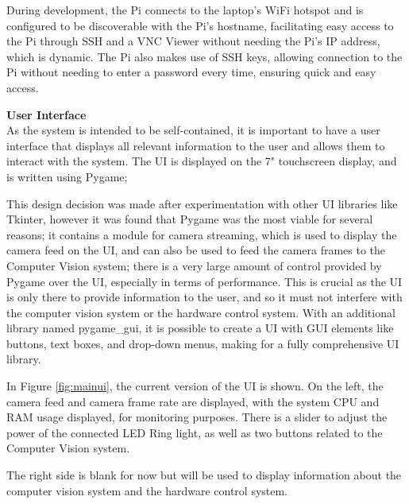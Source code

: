 During development, the Pi connects to the laptop's WiFi hotspot and is configured to be discoverable with the Pi's hostname, facilitating easy access to the Pi through
SSH and a VNC Viewer without needing the Pi's IP address, which is dynamic. The Pi also makes use of SSH keys, allowing connection 
to the Pi without needing to enter a password every time, ensuring quick and easy access.



\noindent
\textbf{User Interface} \\
As the system is intended to be self-contained, it is important to have a user interface that displays all relevant information to the user
and allows them to interact with the system. The UI is displayed on the 7" touchscreen display, and is written using Pygame\cite{pygamedoc};

This design decision was made after experimentation with other UI libraries like Tkinter\cite{tkinterdoc}, however it was found that Pygame was the most
viable for several reasons; it contains a module for camera streaming, which is used to display the camera feed on the UI, and can also be used to
feed the camera frames to the Computer Vision system; there is a very large amount of control provided by Pygame over the UI, especially in terms of 
performance. This is crucial as the UI is only there to provide information to the user, and so it must not interfere with the
computer vision system or the hardware control system. With an additional library named pygame\_gui\cite{pygamegui}, it is possible to create a UI with 
GUI elements like buttons, text boxes, and drop-down menus, making for a fully comprehensive UI library.

In Figure \ref*{fig:mainui}, the current version of the UI is shown. On the left, the camera feed and camera frame rate are displayed, with the system
CPU and RAM usage displayed, for monitoring purposes. There is a slider to adjust the power of the connected LED Ring light, as well as two buttons
related to the Computer Vision system.

The right side is blank for now but will be used to display information about the computer vision system and the hardware control system.

